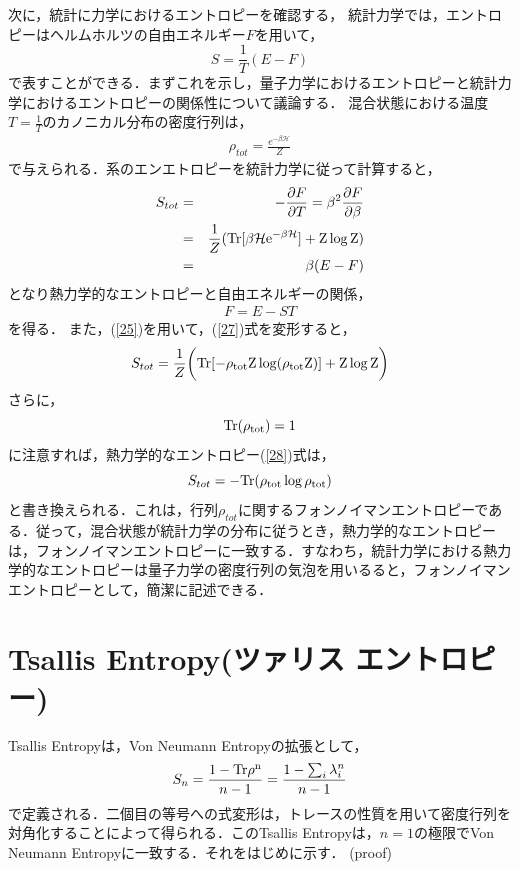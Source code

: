 次に，統計に力学におけるエントロピーを確認する，
統計力学では，エントロピーはヘルムホルツの自由エネルギー$F$を用いて，
\begin{equation}
  S=\frac{1}{T}(E-F)
\end{equation}
で表すことができる．まずこれを示し，量子力学におけるエントロピーと統計力学におけるエントロピーの関係性について議論する．
混合状態における温度$T=\frac{1}{T}$のカノニカル分布の密度行列は，
\begin{eqnarray}
\label{25}
\rho_{tot}=\frac{e^{-\beta \mathcal{H}}}{Z}
\end{eqnarray}
で与えられる．系のエンエトロピーを統計力学に従って計算すると，
\begin{eqnarray}
S_{tot}&=&-\frac{\partial F}{\partial T}=\beta^2\frac{\partial F}{\partial \beta} \\
\label{27}
&=&\frac{1}{Z}(\rm{Tr}[\beta\mathcal{H}e^{-\beta \mathcal{H}}]+Z\log Z) \\
\label{28}
&=&\beta(E-F)
\end{eqnarray}
となり熱力学的なエントロピーと自由エネルギーの関係，
\begin{eqnarray}
F=E-ST
\end{eqnarray}
を得る．
また，(\ref{25})を用いて，(\ref{27})式を変形すると，
\begin{equation}
  S_{tot}=\frac{1}{Z}\biggl(\rm{Tr}[-\rho_{tot}Z\log(\rho_{tot}Z)]+Z\log Z\biggr)
\end{equation}
さらに，
\begin{equation}
  \rm{Tr}(\rho_{tot})=1
\end{equation}
に注意すれば，熱力学的なエントロピー(\ref{28})式は，
\begin{equation}
  S_{tot}=-\rm{Tr}(\rho_{tot}\log\rho_{tot})
\end{equation}と書き換えられる．これは，行列$\rho_{tot}$に関するフォンノイマンエントロピーである．従って，混合状態が統計力学の分布に従うとき，熱力学的なエントロピーは，フォンノイマンエントロピーに一致する．すなわち，統計力学における熱力学的なエントロピーは量子力学の密度行列の気泡を用いるると，フォンノイマンエントロピーとして，簡潔に記述できる．

\section{Tsallis Entropy(ツァリス エントロピー)}
Tsallis Entropyは，Von Neumann Entropyの拡張として，
\begin{align}
  S_{n}=\frac{1-\rm{Tr}\rho^n}{n-1}=\frac{1-\sum_{i}\lambda_{i}^n}{n-1}
\end{align}
で定義される．二個目の等号への式変形は，トレースの性質を用いて密度行列を対角化することによって得られる．このTsallis Entropyは，$n=1$の極限でVon Neumann Entropyに一致する．それをはじめに示す．
(proof)

